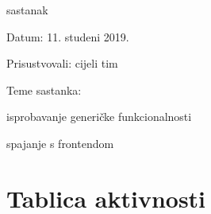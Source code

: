 \begin{packed_enum}
			\item  sastanak
			
			\item[] \begin{packed_item}
				\item Datum: 11. studeni 2019.
				\item Prisustvovali: cijeli tim
				\item Teme sastanka:
				\begin{packed_item}
					\item isprobavanje generičke funkcionalnosti 
					\item spajanje s frontendom
				\end{packed_item}
			\end{packed_item}
			
			
		\end{packed_enum}
		
		\eject
		\section*{Tablica aktivnosti}
		
			
			
			 
						
